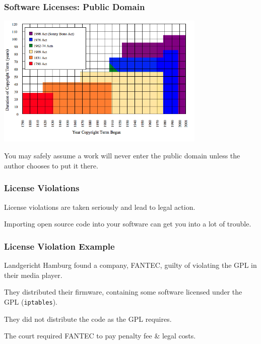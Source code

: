 \begin{frame}
\frametitle{Software Licenses: Public Domain}

\begin{changemargin}{1cm}

\begin{center}
\includegraphics[width=0.75\textwidth]{images/copyright-term.png}
\end{center}

You may safely assume a work will never enter the public domain unless the author chooses to put it there.

\end{changemargin}
\end{frame}


\begin{frame}
\frametitle{License Violations}

\begin{changemargin}{1cm}

License violations are taken seriously and lead to legal action.

Importing open source code into your software can get you into a lot of trouble.

\end{changemargin}
\end{frame}



\begin{frame}
\frametitle{License Violation Example}

\begin{changemargin}{1cm}

Landgericht Hamburg found a company, FANTEC, guilty of violating the GPL in their media player.

They distributed their firmware, containing some software licensed under the GPL (\texttt{iptables}).

They did not distribute the code as the GPL requires.

The court required FANTEC to pay penalty fee \& legal costs.


\end{changemargin}
\end{frame}




